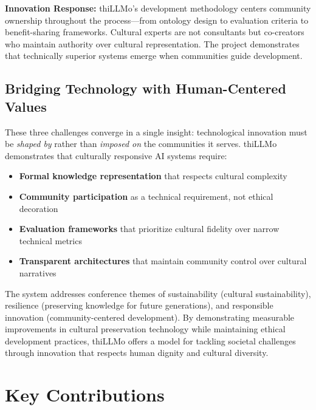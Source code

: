 \documentclass[11pt,a4paper]{article}
\begin{document}
\textbf{Innovation Response:} thiLLMo's development methodology centers community ownership throughout the process---from ontology design to evaluation criteria to benefit-sharing frameworks. Cultural experts are not consultants but co-creators who maintain authority over cultural representation. The project demonstrates that technically superior systems emerge when communities guide development.

\subsection*{Bridging Technology with Human-Centered Values}

These three challenges converge in a single insight: technological innovation must be \emph{shaped by} rather than \emph{imposed on} the communities it serves. thiLLMo demonstrates that culturally responsive AI systems require:

\begin{itemize}
    \item \textbf{Formal knowledge representation} that respects cultural complexity
    \item \textbf{Community participation} as a technical requirement, not ethical decoration
    \item \textbf{Evaluation frameworks} that prioritize cultural fidelity over narrow technical metrics
    \item \textbf{Transparent architectures} that maintain community control over cultural narratives
\end{itemize}

The system addresses conference themes of sustainability (cultural sustainability), resilience (preserving knowledge for future generations), and responsible innovation (community-centered development). By demonstrating measurable improvements in cultural preservation technology while maintaining ethical development practices, thiLLMo offers a model for tackling societal challenges through innovation that respects human dignity and cultural diversity.

\newpage

\section*{Key Contributions}
\end{document}
